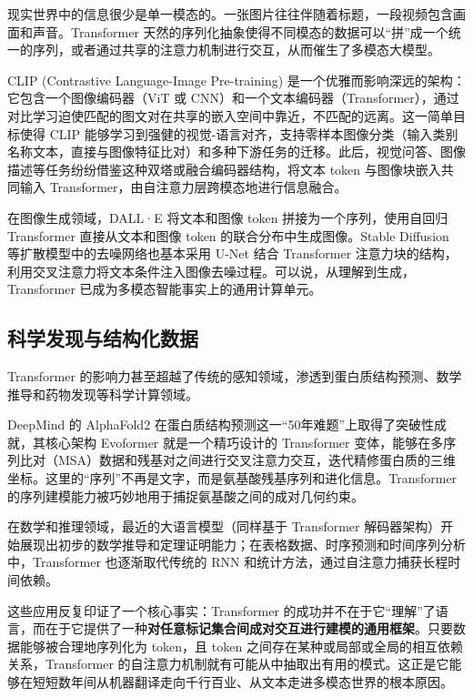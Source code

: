 现实世界中的信息很少是单一模态的。一张图片往往伴随着标题，一段视频包含画面和声音。Transformer 天然的序列化抽象使得不同模态的数据可以“拼”成一个统一的序列，或者通过共享的注意力机制进行交互，从而催生了多模态大模型。

CLIP (Contrastive Language-Image Pre-training)\cite{radford2021learning} 是一个优雅而影响深远的架构：它包含一个图像编码器（ViT 或 CNN）和一个文本编码器（Transformer），通过对比学习迫使匹配的图文对在共享的嵌入空间中靠近，不匹配的远离。这一简单目标使得 CLIP 能够学习到强健的视觉-语言对齐，支持零样本图像分类（输入类别名称文本，直接与图像特征比对）和多种下游任务的迁移。此后，视觉问答、图像描述等任务纷纷借鉴这种双塔或融合编码器结构，将文本 token 与图像块嵌入共同输入 Transformer，由自注意力层跨模态地进行信息融合。

在图像生成领域，DALL·E\cite{ramesh2021zero} 将文本和图像 token 拼接为一个序列，使用自回归 Transformer 直接从文本和图像 token 的联合分布中生成图像。Stable Diffusion 等扩散模型中的去噪网络也基本采用 U-Net 结合 Transformer 注意力块的结构，利用交叉注意力将文本条件注入图像去噪过程。可以说，从理解到生成，Transformer 已成为多模态智能事实上的通用计算单元。

\subsection{科学发现与结构化数据}

Transformer 的影响力甚至超越了传统的感知领域，渗透到蛋白质结构预测、数学推导和药物发现等科学计算领域。

DeepMind 的 AlphaFold2\cite{jumper2021highly} 在蛋白质结构预测这一“50年难题”上取得了突破性成就，其核心架构 Evoformer 就是一个精巧设计的 Transformer 变体，能够在多序列比对（MSA）数据和残基对之间进行交叉注意力交互，迭代精修蛋白质的三维坐标。这里的“序列”不再是文字，而是氨基酸残基序列和进化信息。Transformer 的序列建模能力被巧妙地用于捕捉氨基酸之间的成对几何约束。

在数学和推理领域，最近的大语言模型（同样基于 Transformer 解码器架构）开始展现出初步的数学推导和定理证明能力；在表格数据、时序预测和时间序列分析中，Transformer 也逐渐取代传统的 RNN 和统计方法，通过自注意力捕获长程时间依赖。

这些应用反复印证了一个核心事实：Transformer 的成功并不在于它“理解”了语言，而在于它提供了一种\textbf{对任意标记集合间成对交互进行建模的通用框架}。只要数据能够被合理地序列化为 token，且 token 之间存在某种或局部或全局的相互依赖关系，Transformer 的自注意力机制就有可能从中抽取出有用的模式。这正是它能够在短短数年间从机器翻译走向千行百业、从文本走进多模态世界的根本原因。

